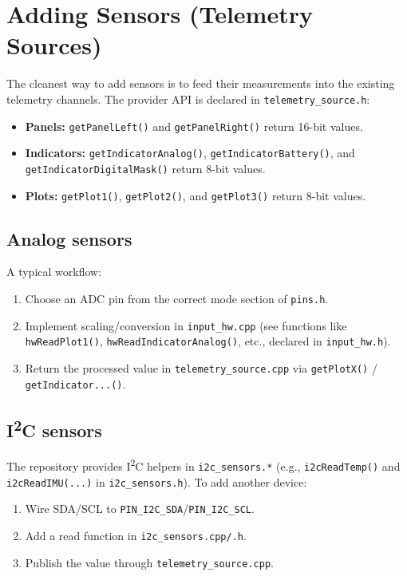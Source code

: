 \section{Adding Sensors (Telemetry Sources)}

The cleanest way to add sensors is to feed their measurements into the existing telemetry channels. The provider
API is declared in \texttt{telemetry\_source.h}:

\begin{itemize}
    \item \textbf{Panels:} \verb|getPanelLeft()| and \verb|getPanelRight()| return 16-bit values.
    \item \textbf{Indicators:} \verb|getIndicatorAnalog()|, \verb|getIndicatorBattery()|, and
    \verb|getIndicatorDigitalMask()| return 8-bit values.
    \item \textbf{Plots:} \verb|getPlot1()|, \verb|getPlot2()|, and \verb|getPlot3()| return 8-bit values.
\end{itemize}

\subsection{Analog sensors}
A typical workflow:
\begin{enumerate}
    \item Choose an ADC pin from the correct mode section of \texttt{pins.h}.
    \item Implement scaling/conversion in \texttt{input\_hw.cpp} (see functions like \verb|hwReadPlot1()|,
    \verb|hwReadIndicatorAnalog()|, etc., declared in \texttt{input\_hw.h}).
    \item Return the processed value in \texttt{telemetry\_source.cpp} via \verb|getPlotX()| / \verb|getIndicator...()|.
\end{enumerate}

\subsection{I\textsuperscript{2}C sensors}
The repository provides I\textsuperscript{2}C helpers in \texttt{i2c\_sensors.*} (e.g., \verb|i2cReadTemp()| and
\verb|i2cReadIMU(...)| in \texttt{i2c\_sensors.h}). To add another device:
\begin{enumerate}
    \item Wire SDA/SCL to \texttt{PIN\_I2C\_SDA}/\texttt{PIN\_I2C\_SCL}.
    \item Add a read function in \texttt{i2c\_sensors.cpp/.h}.
    \item Publish the value through \texttt{telemetry\_source.cpp}.
\end{enumerate}

